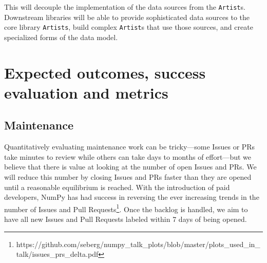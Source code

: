 \documentclass[11pt,letterpaper]{article}  %
\begin{document}
This will decouple the implementation of the data sources from the \texttt{Artist}s.  Downstream libraries will be able to provide sophisticated data sources to the core library \texttt{Artists}, build complex \texttt{Artist}s that use those sources, and create specialized forms of the data model.


\section{Expected outcomes, success evaluation and metrics}
\subsection{Maintenance}

Quantitatively evaluating maintenance work can be tricky---some Issues
or PRs take minutes to review while others can take days to
months of effort---but we believe that there is value at looking at
the number of open Issues and PRs.  We will reduce this number by closing Issues and PRs faster than they are opened until a reasonable equilibrium is reached. With the introduction of paid developers, NumPy has had success in reversing the ever increasing trends in the number of Issues and Pull Requests\footnote{https://github.com/seberg/numpy\_talk\_plots/blob/master/plots\_used\_in\_talk/issues\_prs\_delta.pdf}. Once the backlog is handled, we aim to have all new Issues and Pull Requests labeled within 7 days of being opened.
\end{document}

